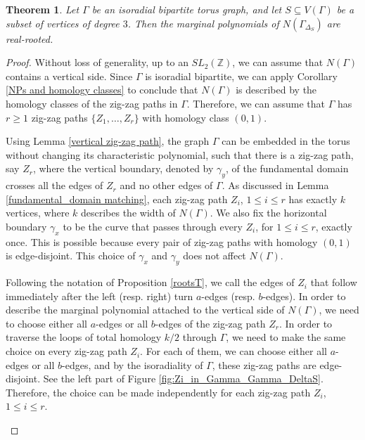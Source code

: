 \documentclass[10pt,a4paper]{amsart}
\newtheorem{thm}{Theorem}
\begin{document}
\begin{thm} \label{real rooted marginals}
    Let $\Gamma$ be an isoradial bipartite torus graph, and let $S \subseteq V(\Gamma)$ be a subset of vertices of degree $3$. Then the marginal polynomials of $N(\Gamma_{\Delta_S})$ are real-rooted.
\end{thm}

\begin{proof}
    Without loss of generality, up to an $SL_2(\mathbb{Z})$, we can assume that $N(\Gamma)$ contains a vertical side. Since $\Gamma$ is isoradial bipartite, we can apply Corollary \ref{NPs and homology classes} to conclude that $N(\Gamma)$ is described by the homology classes of the zig-zag paths in $\Gamma$. Therefore, we can assume that $\Gamma$ has $r \geq 1$ zig-zag paths $\{Z_1, \dots, Z_r\}$ with homology class $(0,1)$.

    Using Lemma \ref{vertical zig-zag path}, the graph $\Gamma$ can be embedded in the torus without changing its characteristic polynomial, such that there is a zig-zag path, say $Z_r$, where the vertical boundary, denoted by $\gamma_y$, of the fundamental domain crosses all the edges of $Z_r$ and no other edges of $\Gamma$. As discussed in Lemma \ref{fundamental_domain matching}, each zig-zag path $Z_i$, $1 \leq i \leq r$ has exactly $k$ vertices, where $k$ describes the width of $N(\Gamma)$. We also fix the horizontal boundary $\gamma_x$ to be the curve that passes through every $Z_i$, for $1 \leq i \leq r$, exactly once. This is possible because every pair of zig-zag paths with homology $(0,1)$ is edge-disjoint. This choice of $\gamma_x$ and $\gamma_y$ does not affect $N(\Gamma)$. 

    Following the notation of Proposition \ref{rootsT}, we call the edges of $Z_i$ that follow immediately after the left (resp. right) turn $a$-edges (resp. $b$-edges). In order to describe the marginal polynomial attached to the vertical side of $N(\Gamma)$, we need to choose either all $a$-edges or all $b$-edges of the zig-zag path $Z_r$. In order to traverse the loops of total homology $k/2$ through $\Gamma$, we need to make the same choice on every zig-zag path $Z_i$. For each of them, we can choose either all $a$-edges or all $b$-edges, and by the isoradiality of $\Gamma$, these zig-zag paths are edge-disjoint. See the left part of Figure \ref{fig:Zi_in_Gamma_Gamma_DeltaS}. Therefore, the choice can be made independently for each zig-zag path $Z_i$, $1 \leq i \leq r$. 

    \begin{figure}[h!]
    \centering
    

\end{figure}
\end{proof}
\end{document}
